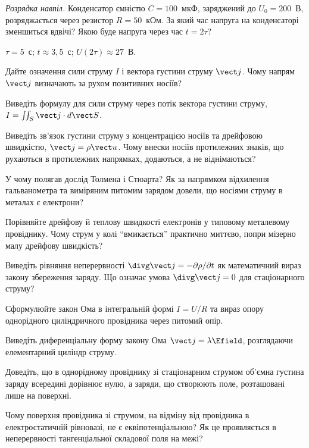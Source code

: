 \begin{problem}\label{prb:RCDischargeHalf}
	\emph{Розрядка навпіл.} Конденсатор ємністю $C=100$~мкФ, заряджений до $U_0=200$~В, розряджається через резистор $R=50$~кОм.
	За який час напруга на конденсаторі зменшиться вдвічі? Якою буде напруга через час $t=2\tau$?
	\begin{solution}
		$\tau=5$~с; $t\approx3{,}5$~с; $U(2\tau)\approx27$~В.
	\end{solution}
\end{problem}


\begin{Questions}
\begin{quizlist}
	\item Дайте означення сили струму $I$ і вектора густини струму $\vect j$. Чому напрям $\vect j$ визначають за рухом позитивних носіїв?
	\item Виведіть формулу для сили струму через потік вектора густини струму, $I = \iint_S\vect j\cdot d\vect S$.
	\item Виведіть зв'язок густини струму з концентрацією носіїв та дрейфовою швидкістю, $\vect j = \rho\vect u$. Чому внески носіїв протилежних знаків, що рухаються в протилежних напрямках, додаються, а не віднімаються?
	\item У чому полягав дослід Толмена і Стюарта? Як за напрямком відхилення гальванометра та виміряним питомим зарядом довели, що носіями струму в металах є електрони?
	\item Порівняйте дрейфову й теплову швидкості електронів у типовому металевому провіднику. Чому струм у колі \enquote{вмикається} практично миттєво, попри мізерно малу дрейфову швидкість?
	\item Виведіть рівняння неперервності $\divg\vect j = -\partial\rho/\partial t$ як математичний вираз закону збереження заряду. Що означає умова $\divg\vect j=0$ для стаціонарного струму?
	\item Сформулюйте закон Ома в інтегральній формі $I=U/R$ та вираз опору однорідного циліндричного провідника через питомий опір.
	\item Виведіть диференціальну форму закону Ома $\vect j = \lambda\Efield$, розглядаючи елементарний циліндр струму.
	\item Доведіть, що в однорідному провіднику зі стаціонарним струмом об'ємна густина заряду всередині дорівнює нулю, а заряди, що створюють поле, розташовані лише на поверхні.
	\item Чому поверхня провідника зі струмом, на відміну від провідника в електростатичній рівновазі, не є еквіпотенціальною? Як це проявляється в неперервності тангенціальної складової поля на межі?

\end{quizlist}
\end{Questions}
